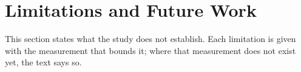 %

\section{Limitations and Future Work}\label{sec:limitations}

This section states what the study does not establish. Each limitation is given with the
measurement that bounds it; where that measurement does not exist yet, the text says so.

